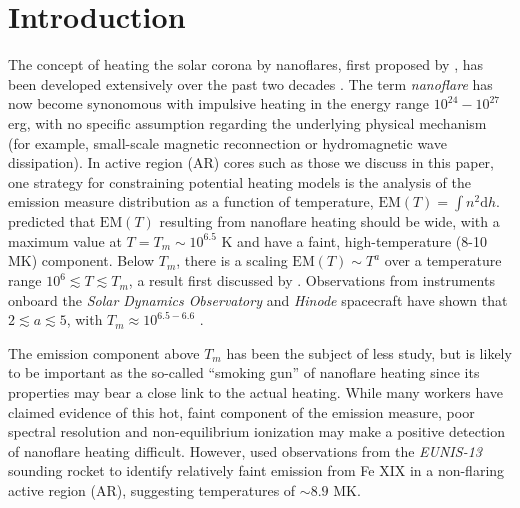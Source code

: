 \documentclass[preprint,linenumbers]{aastex}
\begin{document}
	\section{Introduction}
	\label{sec:intro}
	\par The concept of heating the solar corona by nanoflares, first proposed by \citet{parker_nanoflares_1988}, has been developed extensively over the past two decades \citep[e.g.][]{cargill_implications_1994,cargill_nanoflare_2004,klimchuk_solving_2006}. The term \textit{nanoflare} has now become synonomous with impulsive heating in the energy range $10^{24}-10^{27}$ erg, with no specific assumption regarding the underlying physical mechanism (for example, small-scale magnetic reconnection or hydromagnetic wave dissipation). In active region (AR) cores such as those we discuss in this paper, one strategy for constraining potential heating models is the analysis of the emission measure distribution as a function of temperature, $\mathrm{EM}(T)=\int n^2\mathrm{d}h$. \citet{cargill_implications_1994,cargill_nanoflare_2004} predicted that $\mathrm{EM}(T)$ resulting from nanoflare heating should be wide, with a maximum value at $T=T_m\sim10^{6.5}$ K and have a faint, high-temperature (8-10 MK) component. Below $T_m$, there is a scaling $\mathrm{EM}(T)\sim T^a$ over a temperature range $10^6\lesssim T\lesssim T_m$, a result first discussed by \citet{jordan_structure_1975}. Observations from instruments onboard the \textit{Solar Dynamics Observatory} \citep[\textit{SDO},][]{pesnell_solar_2012} and \textit{Hinode} spacecraft \citep{kosugi_hinode_2007} have shown that $2\lesssim a\lesssim5$, with $T_m\approx10^{6.5-6.6}$ \citep{tripathi_emission_2011,warren_constraints_2011,warren_systematic_2012,winebarger_using_2011,schmelz_cold_2012,del_zanna_evolution_2015}.
	\par The emission component above $T_m$ has been the subject of less study, but is likely to be important as the so-called ``smoking gun'' of nanoflare heating since its properties may bear a close link to the actual heating. While many workers \citep{reale_evidence_2009,schmelz_hinode_2009,miceli_x-ray_2012,testa_hinode/eis_2012,del_zanna_elemental_2014,petralia_thermal_2014,schmelz_hot_2015} have claimed evidence of this hot, faint component of the emission measure, poor spectral resolution \citep{testa_temperature_2011,winebarger_defining_2012} and non-equilibrium ionization \citep{bradshaw_explosive_2006,reale_nonequilibrium_2008} may make a positive detection of nanoflare heating difficult. However, \citet{brosius_pervasive_2014} used observations from the \textit{EUNIS-13} sounding rocket to identify relatively faint emission from Fe XIX in a non-flaring active region (AR), suggesting temperatures of $\sim8.9$ MK.
\end{document}
